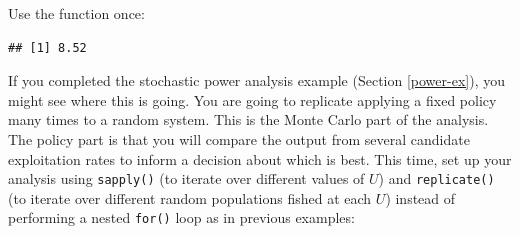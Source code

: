 \documentclass[]{book}
\newenvironment{Shaded}{\begin{snugshade}}{\end{snugshade}}
\newcommand{\KeywordTok}[1]{\textcolor[rgb]{0.13,0.29,0.53}{\textbf{#1}}}
\newcommand{\DataTypeTok}[1]{\textcolor[rgb]{0.13,0.29,0.53}{#1}}
\newcommand{\DecValTok}[1]{\textcolor[rgb]{0.00,0.00,0.81}{#1}}
\newcommand{\FloatTok}[1]{\textcolor[rgb]{0.00,0.00,0.81}{#1}}
\newcommand{\StringTok}[1]{\textcolor[rgb]{0.31,0.60,0.02}{#1}}
\newcommand{\CommentTok}[1]{\textcolor[rgb]{0.56,0.35,0.01}{\textit{#1}}}
\newcommand{\ControlFlowTok}[1]{\textcolor[rgb]{0.13,0.29,0.53}{\textbf{#1}}}
\newcommand{\OperatorTok}[1]{\textcolor[rgb]{0.81,0.36,0.00}{\textbf{#1}}}
\newcommand{\NormalTok}[1]{#1}
\theoremstyle{definition}
\theoremstyle{definition}
\theoremstyle{definition}
\theoremstyle{remark}
\begin{document}
Use the function once:

\begin{Shaded}
\end{Shaded}

\begin{verbatim}
## [1] 8.52
\end{verbatim}

If you completed the stochastic power analysis example (Section
\ref{power-ex}), you might see where this is going. You are going to
replicate applying a fixed policy many times to a random system. This is
the Monte Carlo part of the analysis. The policy part is that you will
compare the output from several candidate exploitation rates to inform a
decision about which is best. This time, set up your analysis using
\texttt{sapply()} (to iterate over different values of \(U\)) and
\texttt{replicate()} (to iterate over different random populations
fished at each \(U\)) instead of performing a nested \texttt{for()} loop
as in previous examples:

\begin{Shaded}
\end{Shaded}
\end{document}
